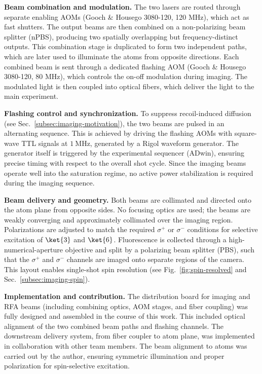 \textbf{Beam combination and modulation.}  
The two lasers are routed through separate enabling AOMs (Gooch \& Housego 3080-120, 120 MHz), which act as fast shutters. The output beams are then combined on a non-polarizing beam splitter (nPBS), producing two spatially overlapping but frequency-distinct outputs. This combination stage is duplicated to form two independent paths, which are later used to illuminate the atoms from opposite directions. Each combined beam is sent through a dedicated flashing AOM (Gooch \& Housego 3080-120, 80 MHz), which controls the on-off modulation during imaging. The modulated light is then coupled into optical fibers, which deliver the light to the main experiment.

\textbf{Flashing control and synchronization.}  
To suppress recoil-induced diffusion (see Sec.~\ref{subsec:imaging-motivation}), the two beams are pulsed in an alternating sequence. This is achieved by driving the flashing AOMs with square-wave TTL signals at $1~\mathrm{MHz}$, generated by a Rigol waveform generator. The generator itself is triggered by the experimental sequencer (ADwin), ensuring precise timing with respect to the overall shot cycle. Since the imaging beams operate well into the saturation regime, no active power stabilization is required during the imaging sequence.

\textbf{Beam delivery and geometry.}  
Both beams are collimated and directed onto the atom plane from opposite sides. No focusing optics are used; the beams are weakly converging and approximately collimated over the imaging region. Polarizations are adjusted to match the required $\sigma^+$ or $\sigma^-$ conditions for selective excitation of $\ket{3}$ and $\ket{6}$. Fluorescence is collected through a high-numerical-aperture objective and split by a polarizing beam splitter (PBS), such that the $\sigma^+$ and $\sigma^-$ channels are imaged onto separate regions of the camera. This layout enables single-shot spin resolution (see Fig.~\ref{fig:spin-resolved} and Sec.~\ref{subsec:imaging-spin}).

\textbf{Implementation and contribution.}  
The distribution board for imaging and RFA beams (including combining optics, AOM stages, and fiber coupling) was fully designed and assembled in the course of this work. This included optical alignment of the two combined beam paths and flashing channels. The downstream delivery system, from fiber coupler to atom plane, was implemented in collaboration with other team members. The beam alignment to atoms was carried out by the author, ensuring symmetric illumination and proper polarization for spin-selective excitation.


